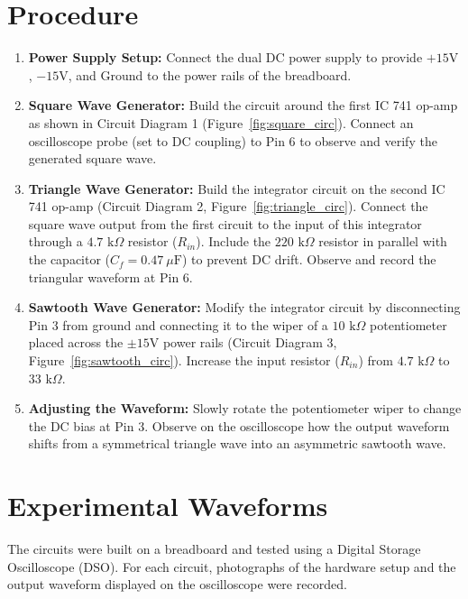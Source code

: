 \documentclass[11pt,a4paper]{article}
\begin{document}
\section{Procedure}
\begin{enumerate}
    \item \textbf{Power Supply Setup:} Connect the dual DC power supply to provide $+15\text{V}$, $-15\text{V}$, and Ground to the power rails of the breadboard.
    \item \textbf{Square Wave Generator:} Build the circuit around the first IC 741 op-amp as shown in Circuit Diagram 1 (Figure~\ref{fig:square_circ}). Connect an oscilloscope probe (set to DC coupling) to Pin 6 to observe and verify the generated square wave.
    \item \textbf{Triangle Wave Generator:} Build the integrator circuit on the second IC 741 op-amp (Circuit Diagram 2, Figure~\ref{fig:triangle_circ}). Connect the square wave output from the first circuit to the input of this integrator through a $4.7\text{ k}\Omega$ resistor ($R_{in}$). Include the $220\text{ k}\Omega$ resistor in parallel with the capacitor ($C_f = 0.47\ \mu\text{F}$) to prevent DC drift. Observe and record the triangular waveform at Pin 6.
    \item \textbf{Sawtooth Wave Generator:} Modify the integrator circuit by disconnecting Pin 3 from ground and connecting it to the wiper of a $10\text{ k}\Omega$ potentiometer placed across the $\pm 15\text{V}$ power rails (Circuit Diagram 3, Figure~\ref{fig:sawtooth_circ}). Increase the input resistor ($R_{in}$) from $4.7\text{ k}\Omega$ to $33\text{ k}\Omega$.
    \item \textbf{Adjusting the Waveform:} Slowly rotate the potentiometer wiper to change the DC bias at Pin 3. Observe on the oscilloscope how the output waveform shifts from a symmetrical triangle wave into an asymmetric sawtooth wave.
\end{enumerate}

\section{Experimental Waveforms}
The circuits were built on a breadboard and tested using a Digital Storage Oscilloscope (DSO). For each circuit, photographs of the hardware setup and the output waveform displayed on the oscilloscope were recorded.
\end{document}
